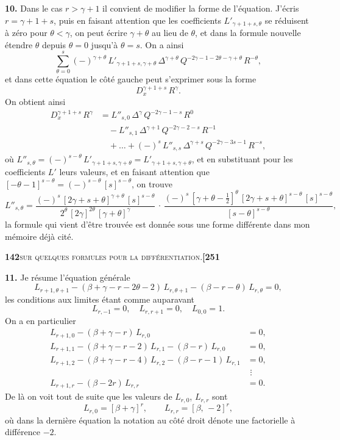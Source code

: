 \documentclass[11pt]{article}
\begin{document}
\textbf{10.} Dans le cas $r > \gamma + 1$ il convient de modifier la forme de l'équation. J'écris $r = \gamma + 1 + s$, puis en faisant attention que les coefficients $L'_{\gamma+1+s,\theta}$ se réduisent à zéro pour $\theta < \gamma$, on peut écrire $\gamma + \theta$ au lieu de $\theta$, et dans la formule nouvelle étendre $\theta$ depuis $\theta = 0$ jusqu'à $\theta = s$. On a ainsi
\[
\sum_{\theta=0}^{s} (-)^{\gamma+\theta}\,L'_{\gamma+1+s,\gamma+\theta}\,\Delta^{\gamma+\theta}\,Q^{-2\gamma-1-2\theta-\gamma+\theta}\,R^{-\theta},
\]
et dans cette équation le côté gauche peut s'exprimer sous la forme
\[
D_x^{\gamma+1+s}\,R^{\gamma}.
\]
On obtient ainsi
\begin{align*}
D_x^{\gamma+1+s}\,R^{\gamma} &= L''_{s,0}\,\Delta^{\gamma}\,Q^{-2\gamma-1-s}\,R^{0}\\
&\quad - L''_{s,1}\,\Delta^{\gamma+1}\,Q^{-2\gamma-2-s}\,R^{-1}\\
&\quad + \ldots + (-)^{s}\,L''_{s,s}\,\Delta^{\gamma+s}\,Q^{-2\gamma-3s-1}\,R^{-s},
\end{align*}
où $L''_{s,\theta} = (-)^{s-\theta}\,L'_{\gamma+1+s,\gamma+\theta} = L'_{\gamma+1+s,\gamma+\theta}$, et en substituant pour les coefficients $L'$ leurs valeurs, et en faisant attention que $[-\theta - 1]^{s-\theta} = (-)^{s-\theta}\,[s]^{s-\theta}$, on trouve
\[
L''_{s,\theta} = \frac{(-)^{s}\,[2\gamma + s + \theta]^{\gamma+\theta}\,[s]^{s-\theta}}{2^{\theta}\,[2\gamma]^{2\theta}\,[\gamma + \theta]^{\gamma}}\,\cdot\,\frac{(-)^{s}\,[\gamma + \theta - \tfrac{1}{2}]^{\theta}\,[2\gamma + s + \theta]^{s-\theta}\,[s]^{s-\theta}}{[s - \theta]^{s-\theta}},
\]
la formule qui vient d'être trouvée est donnée sous une forme différente dans mon mémoire déjà cité.

\newpage

\noindent\textbf{142}\hfill\textsc{sur quelques formules pour la différentiation.}\hfill\textbf{[251}

\medskip

\textbf{11.} Je résume l'équation générale
\[
L_{r+1,\theta+1} - (\beta + \gamma - r - 2\theta - 2)\,L_{r,\theta+1} - (\beta - r - \theta)\,L_{r,\theta} = 0,
\]
les conditions aux limites étant comme auparavant
\[
L_{r,-1} = 0,\quad L_{r,r+1} = 0,\quad L_{0,0} = 1.
\]
On a en particulier
\begin{align*}
L_{r+1,0} - (\beta + \gamma - r)\,L_{r,0} &= 0,\\
L_{r+1,1} - (\beta + \gamma - r - 2)\,L_{r,1} - (\beta - r)\,L_{r,0} &= 0,\\
L_{r+1,2} - (\beta + \gamma - r - 4)\,L_{r,2} - (\beta - r - 1)\,L_{r,1} &= 0,\\
&\,\,\vdots\\
L_{r+1,r} - (\beta - 2r)\,L_{r,r} &= 0.
\end{align*}
De là on voit tout de suite que les valeurs de $L_{r,0}$, $L_{r,r}$ sont
\[
L_{r,0} = [\beta + \gamma]^{r},\qquad L_{r,r} = [\beta,\,-2]^{r},
\]
où dans la dernière équation la notation au côté droit dénote une factorielle à différence $-2$.
\end{document}
